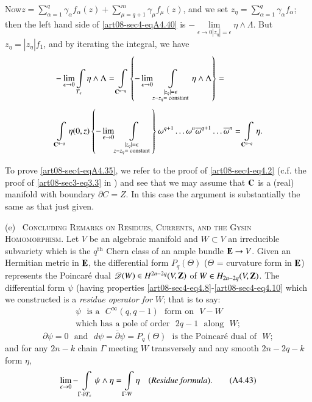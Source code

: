 Now\pageoriginale $z=\sum\limits^{q}_{\alpha=1}\gamma_{\alpha}f_{\alpha}(z)+\sum\limits^{m}_{\mu=q+1}\gamma_{\mu}f_{\mu}(z)$, and we set $z_{\eta}=\sum\limits^{q}_{\alpha=1}\gamma_{\alpha}f_{\alpha}$; then the left hand side of \eqref{art08-sec4-eqA4.40} is $-\lim\limits_{\epsilon\to 0|z_{\eta}|=\epsilon}\eta\wedge \Lambda$. But $z_{\eta}=|z_{\eta}|f_{1}$, and by iterating the integral, we have
\begin{align*}
& -\lim\limits_{\epsilon\to 0}\int\limits_{T_{\epsilon}}\eta\wedge \Lambda=\int\limits_{\mathbf{C}^{n-q}}\left\{-\lim\limits_{\epsilon\to 0}\int\limits_{\substack{|z_{\eta}|=\epsilon\\ z-z_{\eta}=\text{~constant}}}\eta\wedge \Lambda\right\}=\\[4pt]
& \int\limits_{\mathbf{C}^{n-q}}\eta(0,z)\left\{-\lim\limits_{\epsilon\to 0}\int\limits_{\substack{|z_{\eta}|=\epsilon\\ z-z_{\eta}=\text{~constant}}}\right\}\omega^{q+1}\ldots\omega^{n}\overline{\omega}^{q+1}\ldots \overline{\omega}^{n}=\int\limits_{\mathbf{C}^{n-q}}\eta.
\end{align*}

To prove \eqref{art08-sec4-eqA4.35}, we refer to the proof of \eqref{art08-sec4-eq4.2} (c.f. the proof of \eqref{art08-sec3-eq3.3} in \cite{art08-key9}) and see that we may assume that $\mathbf{C}$ is a (real) manifold with boundary $\partial C=Z$. In this case the argument is substantially the same as that just given.

(e)~ \textsc{Concluding Remarks on Residues, Currents, and the Gysin Homomorphism.} Let $V$ be an algebraic manifold and $W\subset V$ an irreducible subvariety which is the $q^{\text{th}}$ Chern class of an ample bundle $\mathbf{E}\to V$. Given an Hermitian metric in $\mathbf{E}$, the differential form $P_{q}(\Theta)$ ($\Theta$ = curvature form in $\mathbf{E}$) represents the Poincar\'e dual $\mathscr{D}(W)\in H^{2n-2q}(V,\mathbf{Z})$ of $W\in H_{2n-2q}(V,\mathbf{Z})$. The differential form $\psi$ (having properties \eqref{art08-sec4-eq4.8}-\eqref{art08-sec4-eq4.10} which we constructed is a {\em residue operator for} $W$; that is to say:
\begin{equation*}
\begin{array}{l}
\psi\text{~ is a~ }C^{\infty}(q,q-1)\text{~ form on~ } V-W\\
\text{which has a pole of order~ }2q-1\text{~ along~ } W;
\end{array}\tag{A4.41}\label{art08-sec4-eqA4.41}
\end{equation*}
\begin{equation*}
\partial \psi=0\text{~ and~ } d\psi=\overline{\partial}\psi=P_{q}(\Theta) \text{~ is the Poincar\'e dual of~ } W;\tag{A4.42}\label{art08-sec4-eqA4.42}
\end{equation*}
and for any $2n-k$ chain $\Gamma$ meeting $W$ transversely and any smooth $2n-2q-k$ form $\eta$,
\begin{equation*}
\lim\limits_{\epsilon\to 0}-\int\limits_{\Gamma\cdot \partial T_{\epsilon}}\psi\wedge \eta=\int\limits_{\Gamma\cdot W}\eta\quad(\text{\em Residue formula}).\tag{A4.43}\label{art08-sec4-eqA4.43}
\end{equation*}

